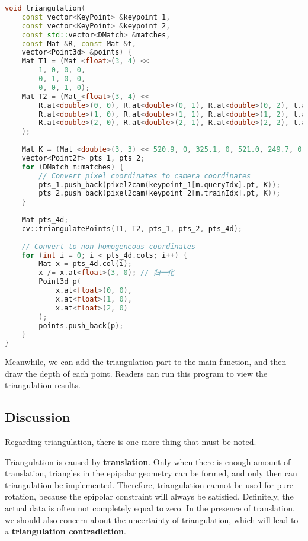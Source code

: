 \begin{lstlisting}[language=c++,caption=slambook2/ch7/triangulation.cpp（片段）]
void triangulation(
	const vector<KeyPoint> &keypoint_1,
	const vector<KeyPoint> &keypoint_2,
	const std::vector<DMatch> &matches,
	const Mat &R, const Mat &t,
	vector<Point3d> &points) {
	Mat T1 = (Mat_<float>(3, 4) <<
		1, 0, 0, 0,
		0, 1, 0, 0,
		0, 0, 1, 0);
	Mat T2 = (Mat_<float>(3, 4) <<
		R.at<double>(0, 0), R.at<double>(0, 1), R.at<double>(0, 2), t.at<double>(0, 0),
		R.at<double>(1, 0), R.at<double>(1, 1), R.at<double>(1, 2), t.at<double>(1, 0),
		R.at<double>(2, 0), R.at<double>(2, 1), R.at<double>(2, 2), t.at<double>(2, 0)
	);
	
	Mat K = (Mat_<double>(3, 3) << 520.9, 0, 325.1, 0, 521.0, 249.7, 0, 0, 1);
	vector<Point2f> pts_1, pts_2;
	for (DMatch m:matches) {
		// Convert pixel coordinates to camera coordinates
		pts_1.push_back(pixel2cam(keypoint_1[m.queryIdx].pt, K));
		pts_2.push_back(pixel2cam(keypoint_2[m.trainIdx].pt, K));
	}
	
	Mat pts_4d;
	cv::triangulatePoints(T1, T2, pts_1, pts_2, pts_4d);
	
	// Convert to non-homogeneous coordinates
	for (int i = 0; i < pts_4d.cols; i++) {
		Mat x = pts_4d.col(i);
		x /= x.at<float>(3, 0); // 归一化
		Point3d p(
			x.at<float>(0, 0),
			x.at<float>(1, 0),
			x.at<float>(2, 0)
		);
		points.push_back(p);
	}
}
\end{lstlisting}

Meanwhile, we can add the triangulation part to the main function, and then draw the depth of each point. Readers can run this program to view the triangulation results.

\subsection{Discussion}
Regarding triangulation, there is one more thing that must be noted.

Triangulation is caused by \textbf{translation}. Only when there is enough amount of translation, triangles in the epipolar geometry can be formed, and only then can triangulation be implemented. Therefore, triangulation cannot be used for pure rotation, because the epipolar constraint will always be satisfied. Definitely, the actual data is often not completely equal to zero. In the presence of translation, we should also concern about the uncertainty of triangulation, which will lead to a \textbf{triangulation contradiction}.

